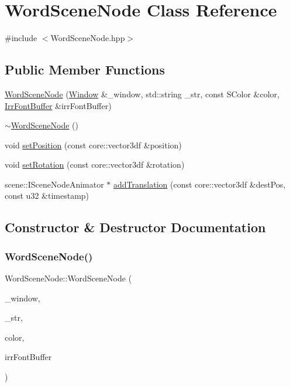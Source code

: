 \hypertarget{class_word_scene_node}{}\section{Word\+Scene\+Node Class Reference}
\label{class_word_scene_node}


{\ttfamily \#include $<$Word\+Scene\+Node.\+hpp$>$}

\subsection*{Public Member Functions}
\begin{DoxyCompactItemize}
\item 
\mbox{\hyperlink{class_word_scene_node_a52803faa2a7c51ddec9afd3b762e0af0}{Word\+Scene\+Node}} (\mbox{\hyperlink{class_window}{Window}} \&\+\_\+window, std\+::string \+\_\+str, const S\+Color \&color, \mbox{\hyperlink{class_irr_font_buffer}{Irr\+Font\+Buffer}} \&irr\+Font\+Buffer)
\item 
\mbox{\hyperlink{class_word_scene_node_aaad0d9d8cb5e79cc40994fd4800cf97e}{$\sim$\+Word\+Scene\+Node}} ()
\item 
void \mbox{\hyperlink{class_word_scene_node_ad70a4b765ef06e2cd64cec7243a536a9}{set\+Position}} (const core\+::vector3df \&position)
\item 
void \mbox{\hyperlink{class_word_scene_node_adf414873110d39866dba2c06e5ffc0d0}{set\+Rotation}} (const core\+::vector3df \&rotation)
\item 
scene\+::\+I\+Scene\+Node\+Animator $\ast$ \mbox{\hyperlink{class_word_scene_node_aef7cd87b51b85d0a5ce1ff2fb6a2181d}{add\+Translation}} (const core\+::vector3df \&dest\+Pos, const u32 \&timestamp)
\end{DoxyCompactItemize}


\subsection{Constructor \& Destructor Documentation}
\mbox{\label{class_word_scene_node_a52803faa2a7c51ddec9afd3b762e0af0}} 
\subsubsection{\texorpdfstring{WordSceneNode()}{WordSceneNode()}}
{\footnotesize\ttfamily Word\+Scene\+Node\+::\+Word\+Scene\+Node (\begin{DoxyParamCaption}\item[{\mbox{\hyperlink{class_window}{Window}} \&}]{\+\_\+window,  }\item[{std\+::string}]{\+\_\+str,  }\item[{const S\+Color \&}]{color,  }\item[{\mbox{\hyperlink{class_irr_font_buffer}{Irr\+Font\+Buffer}} \&}]{irr\+Font\+Buffer }\end{DoxyParamCaption})}

